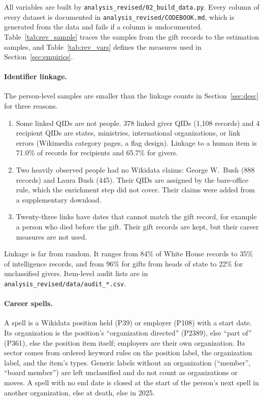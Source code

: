 \documentclass[11pt]{article}
\begin{document}
All variables are built by \texttt{analysis\_revised/02\_build\_data.py}. Every column of every dataset is documented in \texttt{analysis\_revised/CODEBOOK.md}, which is generated from the data and fails if a column is undocumented. Table~\ref{tab:rev_sample} traces the samples from the gift records to the estimation samples, and Table~\ref{tab:rev_vars} defines the measures used in Section~\ref{sec:empirics}.

\begin{table}[ht]
\centering\footnotesize
\caption{Sample construction.}\label{tab:rev_sample}
\resizebox{\linewidth}{!}{}
\end{table}

\paragraph{Identifier linkage.} The person-level samples are smaller than the linkage counts in Section~\ref{sec:desc} for three reasons.
\begin{enumerate}
\item Some linked QIDs are not people. 378 linked giver QIDs (1,108 records) and 4 recipient QIDs are states, ministries, international organizations, or link errors (Wikimedia category pages, a flag design). Linkage to a human item is 71.0\% of records for recipients and 65.7\% for givers.
\item Two heavily observed people had no Wikidata claims: George W.\ Bush (888 records) and Laura Bush (445). Their QIDs are assigned by the bare-office rule, which the enrichment step did not cover. Their claims were added from a supplementary download.
\item Twenty-three links have dates that cannot match the gift record, for example a person who died before the gift. Their gift records are kept, but their career measures are not used.
\end{enumerate}
Linkage is far from random. It ranges from 84\% of White House records to 35\% of intelligence records, and from 96\% for gifts from heads of state to 22\% for unclassified givers. Item-level audit lists are in \texttt{analysis\_revised/data/audit\_*.csv}.

\paragraph{Career spells.} A spell is a Wikidata position held (P39) or employer (P108) with a start date. Its organization is the position's ``organization directed'' (P2389), else ``part of'' (P361), else the position item itself; employers are their own organization. Its sector comes from ordered keyword rules on the position label, the organization label, and the item's types. Generic labels without an organization (``member'', ``board member'') are left unclassified and do not count as organizations or moves. A spell with no end date is closed at the start of the person's next spell in another organization, else at death, else in 2025.
\end{document}
